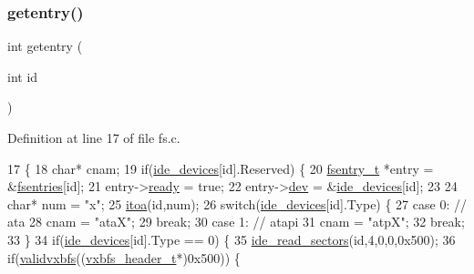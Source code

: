 \subsubsection{\texorpdfstring{getentry()}{getentry()}}
{\footnotesize\ttfamily int getentry (\begin{DoxyParamCaption}\item[{int}]{id }\end{DoxyParamCaption})}



Definition at line 17 of file fs.\+c.


\begin{DoxyCode}
17                      \{
18     \textcolor{keywordtype}{char}* cnam;
19     \textcolor{keywordflow}{if}(\hyperlink{a00035_ab97a828ed4839b575dc382e2bf826e87_ab97a828ed4839b575dc382e2bf826e87}{ide\_devices}[\textcolor{keywordtype}{id}].Reserved) \{
20         \hyperlink{a00242}{fsentry\_t} *entry = &\hyperlink{a00137_a6b46131164b26e476762930c9aae4319_a6b46131164b26e476762930c9aae4319}{fsentries}[id];
21         entry->\hyperlink{a00242_a284522ed97fe1eeebd0fcc039b2ea00a_a284522ed97fe1eeebd0fcc039b2ea00a}{ready} = \textcolor{keyword}{true};
22         entry->\hyperlink{a00242_aaea66ea744fa50f1c54666033884d8d2_aaea66ea744fa50f1c54666033884d8d2}{dev} = &\hyperlink{a00035_ab97a828ed4839b575dc382e2bf826e87_ab97a828ed4839b575dc382e2bf826e87}{ide\_devices}[id];
23         
24         \textcolor{keywordtype}{char}* num = \textcolor{stringliteral}{"x"};
25         \hyperlink{a00113_af749add1ff19b6ff96a62f35ebb49b7e_af749add1ff19b6ff96a62f35ebb49b7e}{itoa}(\textcolor{keywordtype}{id},num);
26         \textcolor{keywordflow}{switch}(\hyperlink{a00035_ab97a828ed4839b575dc382e2bf826e87_ab97a828ed4839b575dc382e2bf826e87}{ide\_devices}[\textcolor{keywordtype}{id}].Type) \{
27             \textcolor{keywordflow}{case} 0: \textcolor{comment}{// ata}
28                 cnam = \textcolor{stringliteral}{"ataX"};
29                 \textcolor{keywordflow}{break};
30             \textcolor{keywordflow}{case} 1: \textcolor{comment}{// atapi}
31                 cnam = \textcolor{stringliteral}{"atpX"};
32                 \textcolor{keywordflow}{break};
33         \}
34         \textcolor{keywordflow}{if}(\hyperlink{a00035_ab97a828ed4839b575dc382e2bf826e87_ab97a828ed4839b575dc382e2bf826e87}{ide\_devices}[\textcolor{keywordtype}{id}].Type == 0) \{
35             \hyperlink{a00032_a9dd84843412753d236e17a15277c5b98_a9dd84843412753d236e17a15277c5b98}{ide\_read\_sectors}(\textcolor{keywordtype}{id},4,0,0,0x500);
36             \textcolor{keywordflow}{if}(\hyperlink{a00173_a078a66e7d52fd4a6df768277b605199c_a078a66e7d52fd4a6df768277b605199c}{validvxbfs}((\hyperlink{a00282}{vxbfs\_header\_t}*)0x500)) \{

\end{DoxyCode}
